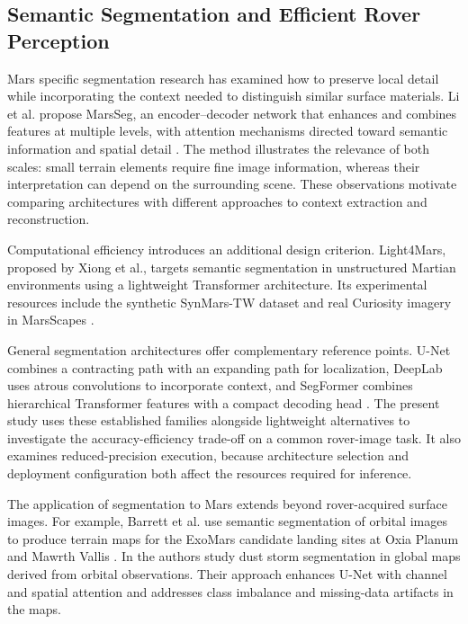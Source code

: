 \subsection{Semantic Segmentation and Efficient Rover Perception}

Mars specific segmentation research has examined how to preserve local detail while incorporating the context needed to distinguish similar surface materials. Li et al. propose MarsSeg, an encoder--decoder network that enhances and combines features at multiple levels, with attention mechanisms directed toward semantic information and spatial detail \cite{li2025marsseg}. The method illustrates the relevance of both scales: small terrain elements require fine image information, whereas their interpretation can depend on the surrounding scene. These observations motivate comparing architectures with different approaches to context extraction and reconstruction.

Computational efficiency introduces an additional design criterion. Light4Mars, proposed by Xiong et al., targets semantic segmentation in unstructured Martian environments using a lightweight Transformer architecture. Its experimental resources include the synthetic SynMars-TW dataset and real Curiosity imagery in MarsScapes \cite{xiong2024light4mars}.

General segmentation architectures offer complementary reference points. U-Net combines a contracting path with an expanding path for localization, DeepLab uses atrous convolutions to incorporate context, and SegFormer combines hierarchical Transformer features with a compact decoding head \cite{ronneberger2015unet,chen2017deeplabv3,xie2021segformer}. The present study uses these established families alongside lightweight alternatives to investigate the accuracy-efficiency trade-off on a common rover-image task. It also examines reduced-precision execution, because architecture selection and deployment configuration both affect the resources required for inference.

The application of segmentation to Mars extends beyond rover-acquired surface images. For example, Barrett et al. use semantic segmentation of orbital images to produce terrain maps for the ExoMars candidate landing sites at Oxia Planum and Mawrth Vallis \cite{barrett2022noahh}. In \cite{venturini2025duststorms} the authors study dust storm segmentation in global maps derived from orbital observations. Their approach enhances U-Net with channel and spatial attention and addresses class imbalance and missing-data artifacts in the maps.

